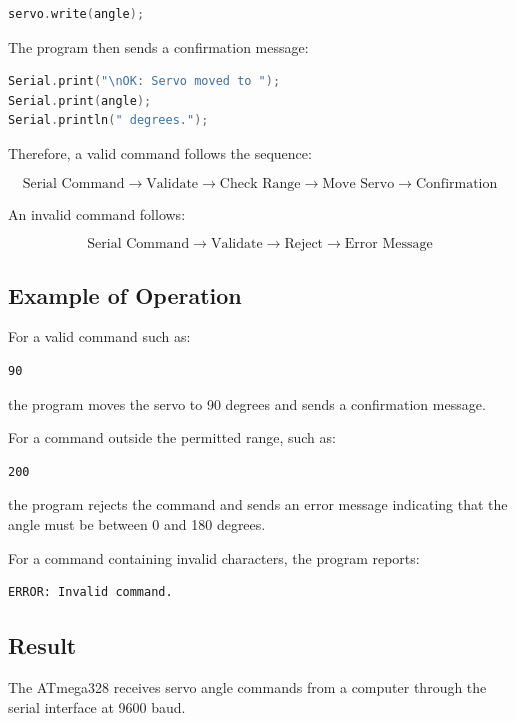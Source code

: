 \documentclass[12pt,a4paper]{article}
\begin{document}
\begin{lstlisting}[language=C]
servo.write(angle);
\end{lstlisting}

The program then sends a confirmation message:

\begin{lstlisting}[language=C]
Serial.print("\nOK: Servo moved to ");
Serial.print(angle);
Serial.println(" degrees.");
\end{lstlisting}

Therefore, a valid command follows the sequence:

\[
\text{Serial Command}
\rightarrow
\text{Validate}
\rightarrow
\text{Check Range}
\rightarrow
\text{Move Servo}
\rightarrow
\text{Confirmation}
\]

An invalid command follows:

\[
\text{Serial Command}
\rightarrow
\text{Validate}
\rightarrow
\text{Reject}
\rightarrow
\text{Error Message}
\]

\subsection{Example of Operation}

For a valid command such as:

\begin{lstlisting}
90
\end{lstlisting}

the program moves the servo to 90 degrees and sends a confirmation
message.

For a command outside the permitted range, such as:

\begin{lstlisting}
200
\end{lstlisting}

the program rejects the command and sends an error message indicating
that the angle must be between 0 and 180 degrees.

For a command containing invalid characters, the program reports:

\begin{lstlisting}
ERROR: Invalid command.
\end{lstlisting}

\subsection{Result}

The ATmega328 receives servo angle commands from a computer through
the serial interface at 9600 baud.
\end{document}
